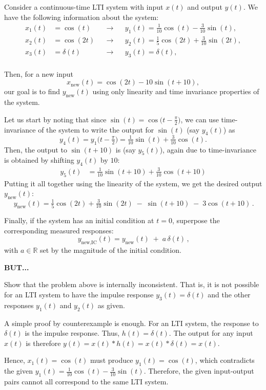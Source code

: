 Consider a continuous-time LTI system with input $x(t)$ and output $y(t)$. We have the following information about the system:
\[
\begin{aligned}
x_1(t)&=\cos(t) 
&&\longrightarrow&&
y_1(t)=\tfrac{1}{10}\cos(t)-\tfrac{3}{10}\sin(t),\\[2pt]
x_2(t)&=\cos(2t) 
&&\longrightarrow&&
y_2(t)=\tfrac{1}{5}\cos(2t)+\tfrac{3}{10}\sin(2t),\\[2pt]
x_3(t)&=\delta(t)
&&\longrightarrow&&
y_3(t)=\delta(t),\\[2pt]
\end{aligned}
\]

Then, for a new input
\[
x_{\text{new}}(t)=\cos(2t)-10\sin(t+10),
\]
our goal is to find $y_{\text{new}}(t)$ using only linearity and time invariance properties of the system. 

Let us start by noting that since $\sin(t)=\cos\!\big(t-\tfrac{\pi}{2}\big)$, we can use time-invariance of the system to write the output for $\sin(t)$ (say $y_4(t)$) as
\[
y_4(t)=y_1\!\Big(t-\tfrac{\pi}{2}\Big)
=\tfrac{1}{10}\sin(t)+\tfrac{3}{10}\cos(t).
\]
Then, the output to $\sin(t+10)$ is (say $y_5(t)$), again due to time-invariance is obtained by shifting $y_4(t)$ by $10$:
\[
\begin{aligned}
y_5(t)
&=\tfrac{1}{10}\sin(t+10)+\tfrac{3}{10}\cos(t+10)
\end{aligned}
\]
Putting it all together using the linearity of the system, we get the desired output $y_{\text{new}}(t)$:
\[\,y_{\text{new}}(t)
=\tfrac{1}{5}\cos(2t)+\tfrac{3}{10}\sin(2t)\;-\;\sin(t+10)\;-\;3\cos(t+10)\,.
\]

Finally, if the system has an initial condition at $t=0$, superpose the corresponding measured responses:
\[
\,y_{\text{new,IC}}(t)=y_{\text{new}}(t)\;+\;a\,\delta(t)\,,
\]
with $a \in\mathbb{R}$ set by the magnitude of the initial condition.

\textbf{\color{red}BUT...}
\begin{popquiz}
Show that the problem above is internally inconsistent. That is, it is not possible for an LTI system to have the impulse response $y_3(t)=\delta(t)$ and the other responses $y_1(t)$ and $y_2(t)$ as given.

\popqsplit
A simple proof by counterexample is enough. For an LTI system, the response to \(\delta(t)\) is the impulse response. Thus,
$
h(t)=\delta(t).
$
The output for any input \(x(t)\) is therefore
$
y(t)=x(t)*h(t)=x(t)*\delta(t)=x(t).
$

Hence, \(x_1(t)=\cos(t)\) must produce \(y_1(t)=\cos(t)\), which contradicts the given
$
y_1(t)=\frac{1}{10}\cos(t)-\frac{3}{10}\sin(t).
$
Therefore, the given input-output pairs cannot all correspond to the same LTI system.
\end{popquiz}
